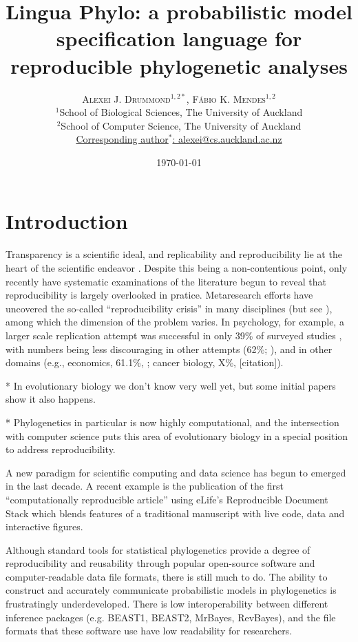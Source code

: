 \documentclass[oneside]{article}
\title{Lingua Phylo: a probabilistic model specification language for
  reproducible phylogenetic analyses}
\author{\textsc{Alexei J. Drummond$^{1,2*}$}, \textsc{F\'{a}bio K. Mendes$^{1,2}$}\\%
\small $^1$School of Biological Sciences, The University of Auckland\\
\small $^2$School of Computer Science, The University of Auckland\\
\small
\href{mailto:alexei@cs.auckland.ac.nz}{Corresponding author$^*$: alexei@cs.auckland.ac.nz}
}
\date{\today} %
\begin{document}
\maketitle


\section{Introduction}

Transparency is a scientific ideal, and replicability and
reproducibility lie at the heart of the scientific endeavor
\citep{nas19,munafo17}.
Despite this being a non-contentious point, only recently have
systematic examinations of the literature begun to reveal that
reproducibility is largely overlooked in pratice.
Metaresearch efforts have uncovered the so-called ``reproducibility
crisis'' \citep{baker16} in many disciplines (but see
\citep{fanneli18}), among which the dimension of the problem varies.
In psychology, for example, a larger scale replication attempt was
successful in only 39\% of surveyed studies \citep{openscience15},
with numbers being less discouraging in other attempts (62\%;
\citep{camerer18}), and in other domains (e.g., economics, 61.1\%,
\citep{camerer16}; cancer biology, X\%, [citation]).

* In evolutionary biology we don't know very well yet, but some
initial papers show it also happens.

* Phylogenetics in particular is now highly computational, and the
intersection with computer science puts this area of evolutionary
biology in a special position to address reproducibility.

A new paradigm for scientific computing and data science has begun to
emerged in the last decade.
A recent example is the publication of the
first ``computationally reproducible article'' using eLife's
Reproducible Document Stack which blends features of a traditional
manuscript with live code, data and interactive figures.

Although standard tools for statistical phylogenetics provide a degree
of reproducibility and reusability through popular open-source
software and computer-readable data file formats, there is still much
to do.
The ability to construct and accurately communicate
probabilistic models in phylogenetics is frustratingly
underdeveloped.
There is low interoperability between different
inference packages (e.g. BEAST1, BEAST2, MrBayes, RevBayes), and the
file formats that these software use have low readability for
researchers.
\end{document}
